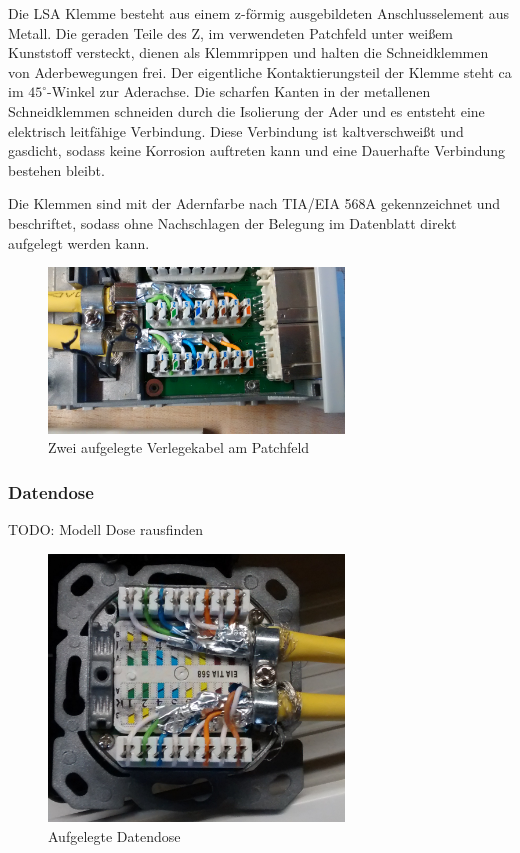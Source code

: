 \documentclass[
a4paper,     %
 headsepline, %
11pt         %
]{scrartcl}  %
\begin{document}
Die LSA Klemme besteht aus einem z-förmig ausgebildeten Anschlusselement aus Metall.
Die geraden Teile des Z, im verwendeten Patchfeld unter weißem Kunststoff versteckt, dienen als Klemmrippen und halten die Schneidklemmen von Aderbewegungen frei.
Der eigentliche Kontaktierungsteil der Klemme steht ca im $45^{\circ}$-Winkel zur Aderachse.
Die scharfen Kanten in der metallenen Schneidklemmen schneiden durch die Isolierung der Ader und es entsteht eine elektrisch leitfähige Verbindung.
Diese Verbindung ist kaltverschweißt und gasdicht, sodass keine Korrosion auftreten kann und eine Dauerhafte Verbindung bestehen bleibt.

Die Klemmen sind mit der Adernfarbe nach TIA/EIA 568A gekennzeichnet und beschriftet, sodass ohne Nachschlagen der Belegung im Datenblatt direkt aufgelegt werden kann.

\begin{figure}[htbp] 
	\centering
	\includegraphics[width=0.7\textwidth]{patchfeld.jpg}
	\caption{Zwei aufgelegte Verlegekabel am Patchfeld}
	\label{fig:Kabel1}
\end{figure}

\subsubsection{Datendose}
TODO: Modell Dose rausfinden \\

\begin{figure}[htbp] 
	\centering
	\includegraphics[width=0.7\textwidth]{anschlussdose.jpg}
	\caption{Aufgelegte Datendose}
	\label{fig:Dose1}
\end{figure}
\end{document}
